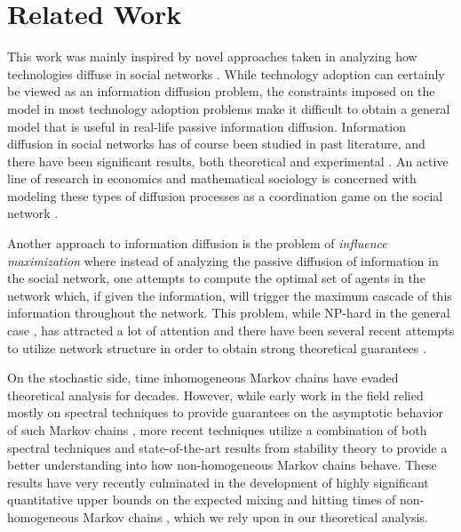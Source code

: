 \documentclass[format=acmsmall, review=false]{acmart}
\begin{document}
\section{Related Work}

\par This work was mainly inspired by novel approaches taken in analyzing how technologies diffuse in social networks
\cite{Immorlica}. While technology adoption can certainly be viewed as an information diffusion problem, the
constraints imposed on the model in most technology adoption problems make it difficult to obtain a general model that
is useful in real-life passive information diffusion. Information diffusion in social networks has of course been
studied in past literature, and there have been significant results, both theoretical
\cite{Jackson, Morris, Valente} and experimental \cite{Rogers, Cooper}. An active line of research in economics
and mathematical sociology is concerned with modeling these types of diffusion processes as a coordination game on
the social network \cite{Blume, Ellison, Jackson, Morris, Peyton}.

\par Another approach to information diffusion is the problem of \textit{influence maximization} where instead of
analyzing the passive diffusion of information in the social network, one attempts to compute the optimal set of
agents in the network which, if given the information, will trigger the maximum cascade of this information throughout
the network. This problem, while NP-hard in the general case \cite{Kempe}, has attracted a lot of attention and there
have been several recent attempts to utilize network structure in order to obtain strong theoretical guarantees
\cite{Seeman}.

\par On the stochastic side, time inhomogeneous Markov chains have evaded theoretical analysis for decades. However,
while early work in the field relied mostly on spectral techniques to provide guarantees on the asymptotic behavior
of such Markov chains \cite{Sonin, Fleischer}, more recent techniques utilize a combination of both spectral techniques
and state-of-the-art results from stability theory \cite{SC2, SC3, SC4, SC5} to provide a better understanding into
how non-homogeneous Markov chains behave. These results have very recently culminated in the development of highly
significant quantitative upper bounds on the expected mixing and hitting times of non-homogeneous Markov chains
\cite{SC1, Shen, Douc}, which we rely upon in our theoretical analysis.
\end{document}
